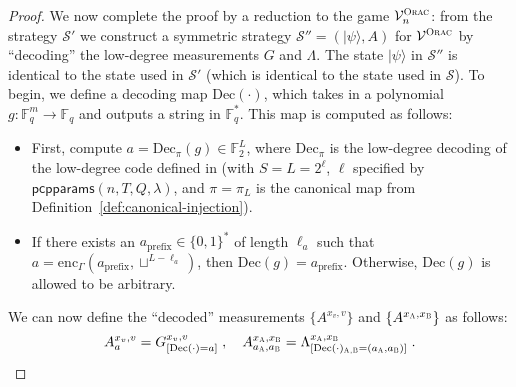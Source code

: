 \documentclass[11pt]{article}
\theoremstyle{definition}
\newcommand{\ket}[1]{|#1\rangle}
\newcommand{\F}{\ensuremath{\mathbb{F}}}
\newcommand{\verifier}{\mathcal{V}}
\newcommand{\strategy}{\mathscr{S}}
\newcommand{\gamestyle}[1]{\ensuremath{\textsc{#1}}\xspace}
\newcommand{\ora}{\gamestyle{Orac}}
\newcommand{\labelstyle}[1]{\ensuremath{\textsc{#1}}\xspace}
\newcommand{\alice}{\labelstyle{A}}
\newcommand{\bob}{\labelstyle{B}}
\newcommand{\pcpparams}{\mathsf{pcpparams}}
\newcommand{\qlen}{Q}
\newcommand{\coded}{\mathrm{Dec}}
\begin{document}
\begin{proof}
We now complete the proof by a reduction to the game $\verifier_n^\ora$: from
the strategy $\strategy'$ we construct a symmetric strategy $\strategy'' =
(\ket{\psi}, A)$ for $\verifier^\ora$ by ``decoding'' the low-degree
measurements $G$ and $\Lambda$.
The state $\ket{\psi}$ in $\strategy''$ is identical to the state used in
$\strategy'$ (which is identical to the state used in $\strategy$).
To begin, we define a decoding map $\coded(\cdot)$, which takes in a polynomial
$g:\F_q^m \to \F_q$ and outputs a string in $\F_q^*$.
This map is computed as follows:
\begin{itemize}
\item First, compute $a = \coded_\pi(g) \in \F_2^L$, where $\coded_\pi$ is the
  low-degree decoding of the low-degree code defined in 
  (with $S=L=2^\ell$, $\ell$ specified by $\pcpparams(n,T,\qlen,\lambda)$, and
  $\pi = \pi_L$ is the canonical map from
  Definition~\ref{def:canonical-injection}).
\item If there exists an $a_{\mathrm{prefix}} \in \{0, 1\}^*$ of length $\ell_a$
  such that $a = \mathrm{enc}_\Gamma(a_{\mathrm{prefix}}, \sqcup^{L - \ell_a})$,
  then $\coded(g) = a_{\mathrm{prefix}}$.
  Otherwise, $\coded(g)$ is allowed to be arbitrary.
\end{itemize}
We can now define the ``decoded'' measurements $\{A^{{x}_v,v}\}$ and
$\{{A}^{{x}_\alice,{x}_\bob}\}$ as follows:
\begin{equation}
  \label{eq:decoded-meas}
  A^{{x}_v,v}_a  = G^{{x}_v, v}_{[\coded(\cdot)=a]} \;,\quad
  A^{{x}_\alice,{x}_\bob}_{a_\alice, a_\bob}  =
  \Lambda^{{x}_\alice,{x}_\bob}_{[\coded(\cdot)_{\alice,\bob}=(a_\alice,a_\bob)]}\;.
\end{equation}
  
	

\end{proof}
\end{document}

